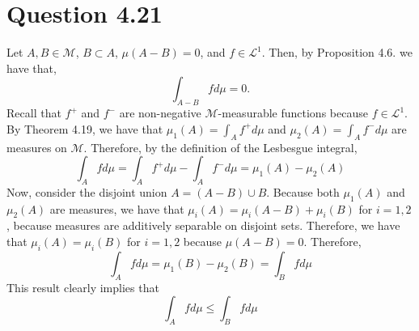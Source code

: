 \documentclass{article}
\begin{document}
  \section*{Question 4.21}
  Let $A, B \in \mathcal{M}$, $B \subset A$, $\mu(A - B) = 0$, and $f \in \mathscr{L}^1$. Then, by Proposition 4.6. we have that,
  \begin{equation}
    \int_{A-B} f d\mu = 0.
  \end{equation}
  Recall that $f^+$ and $f^-$ are non-negative $\mathcal{M}$-measurable functions because $f \in \mathscr{L}^1$. By Theorem 4.19, we have that $\mu_1(A) =  \int_A f^+ d\mu$ and $\mu_2(A) = \int_A f^- d\mu$ are measures on $\mathcal{M}$. Therefore, by the definition of the Lesbesgue integral,
  \begin{equation}
  	\int_A f d\mu =  \int_A f^+ d\mu -  \int_A f^- d\mu = \mu_1(A) - \mu_2(A)
  \end{equation}
  Now, consider the disjoint union $A = (A - B) \cup B$.  Because both $\mu_1(A)$ and $\mu_2(A)$ are measures, we have that $\mu_i(A) = \mu_i(A - B) + \mu_i(B)$ for $i=1,2$, because measures are additively separable on disjoint sets. Therefore, we have that $\mu_i(A) = \mu_i (B)$ for $i=1,2$ because $\mu(A - B) = 0$. Therefore,
  \begin{equation}
  	\int_A f d\mu = \mu_1(B) - \mu_2(B) = \int_B f d\mu
  \end{equation}
  This result clearly implies that
  \begin{equation}
  	\int_A f d\mu \leq \int_{B} f d\mu
  \end{equation}
\end{document}
